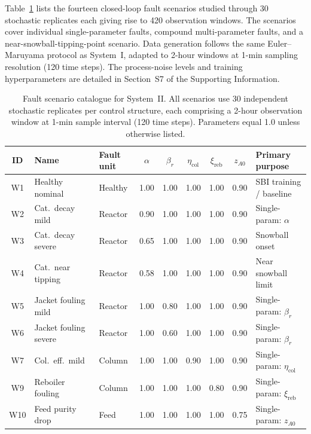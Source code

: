 \documentclass[aps,pre,twocolumn,superscriptaddress]{revtex4-2}
\begin{document}
Table~\ref{tab:si_wu_scenarios} lists the fourteen closed-loop fault scenarios studied through 30 stochastic replicates each giving rise to 420 observation windows. The scenarios cover individual single-parameter faults, compound multi-parameter faults, and a near-snowball-tipping-point scenario.  
Data generation follows the same Euler--Maruyama protocol as System~I, adapted to 2-hour windows at 1-min sampling resolution (120 time steps). The process-noise levels and training hyperparameters are detailed in Section~S7 of the Supporting Information.

\begin{table}[htbp]
\centering
\caption{Fault scenario catalogue for System~II. All scenarios use 30 independent
  stochastic replicates per control structure, each comprising a 2-hour observation
  window at 1-min sample interval (120 time steps). Parameters equal 1.0 unless
  otherwise listed.}
\label{tab:si_wu_scenarios}
\small
\begin{tabular}{cllcccccl}
\toprule
ID & Name & Fault unit & $\alpha$ & $\beta_r$ & $\eta_\mathrm{col}$ & $\xi_\mathrm{reb}$ & $z_{A0}$ & Primary purpose \\
\midrule
W1  & Healthy nominal     & Healthy  & 1.00 & 1.00 & 1.00 & 1.00 & 0.90 & SBI training / baseline \\
W2  & Cat.~decay mild     & Reactor  & 0.90 & 1.00 & 1.00 & 1.00 & 0.90 & Single-param: $\alpha$ \\
W3  & Cat.~decay severe   & Reactor  & 0.65 & 1.00 & 1.00 & 1.00 & 0.90 & Snowball onset \\
W4  & Cat.~near tipping   & Reactor  & 0.58 & 1.00 & 1.00 & 1.00 & 0.90 & Near snowball limit \\
W5  & Jacket fouling mild & Reactor  & 1.00 & 0.80 & 1.00 & 1.00 & 0.90 & Single-param: $\beta_r$ \\
W6  & Jacket fouling severe& Reactor & 1.00 & 0.60 & 1.00 & 1.00 & 0.90 & Single-param: $\beta_r$ \\
W7  & Col.~eff.~mild      & Column   & 1.00 & 1.00 & 0.90 & 1.00 & 0.90 & Single-param: $\eta_\mathrm{col}$ \\
W9  & Reboiler fouling    & Column   & 1.00 & 1.00 & 1.00 & 0.80 & 0.90 & Single-param: $\xi_\mathrm{reb}$ \\
W10 & Feed purity drop    & Feed     & 1.00 & 1.00 & 1.00 & 1.00 & 0.75 & Single-param: $z_{A0}$ \\

\end{tabular}
\end{table}
\end{document}
